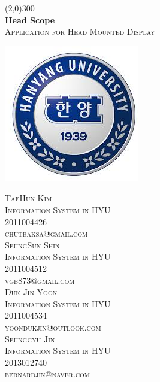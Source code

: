 \documentclass[12pt]{article}
\begin{document}
\begin{titlepage}
\begin{center}
\line(2,0){300}\\	
\huge{\bfseries Head Scope} \\
\textsc{\large Application for Head Mounted Display}\\[2\baselineskip]
\end{center} 

\center
\includegraphics{Unknown}
\\ [15\baselineskip]



\begin{multicols}{2} \noindent 
\textsc {\noindent TaeHun Kim\\ 
Information System in HYU \\
 2011004426 \\ 
 chutbaksa@gmail.com}\\[1\baselineskip]
\textsc{SeungSun Shin \\
 Information System in HYU 
 \\ 2011004512 \\ 
 vgb873@gmail.com}\\[1\baselineskip]
\textsc{Duk Jin Yoon \\
Information System in HYU \\
2011004534 \\
yoondukjin@outlook.com} \\[1\baselineskip]
\textsc{Seunggyu Jin \\ 
Information System in HYU \\
2013012740 \\
bernardjin@naver.com}
\end{multicols}
\end{titlepage}
\end{document}

